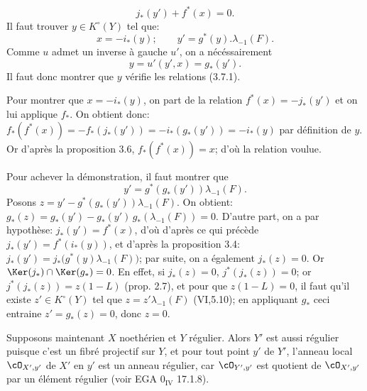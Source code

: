 \[
j_*(y')+f^*(x)=0.
\]
Il
faut trouver \(y\in K^\circ(Y)\) tel que:
\begin{equation}\tag{3.7.1}
x=-i_*(y);\qquad y'=g^*(y).\lambda_{-1}(F).
\end{equation}
Comme \(u\) admet un inverse à gauche \(u'\), on a nécéssairement
\[
y=u'(y',x)=g_*(y').
\]
Il faut donc montrer que \(y\) vérifie les relations (3.7.1).

Pour montrer que \(x=-i_*(y)\), on part de la relation \(f^*(x)=-j_*(y')\) et on lui applique \(f_*\). On obtient donc: \(f_*(f^*(x))=-f_*(j_*(y'))=-i_*(g_*(y'))=-i_*(y)\) par définition de \(y\). Or d'après la proposition 3.6, \(f_*(f^*(x))=x\); d'où la relation voulue.

Pour achever la démonstration, il faut montrer que
\[
y'=g^*(g_*(y'))\lambda_{-1}(F).
\]
Posons \(z=y'-g^*(g_*(y'))\lambda_{-1}(F)\). On obtient: \(g_*(z)=g_*(y')-g_*(y')\,g_*(\lambda_{-1}(F))=0\). D'autre part, on a par hypothèse: \(j_*(y')=f^*(x)\), d'où d'après ce qui précède \(j_*(y')=f^*(i_*(y))\), et d'après la proposition 3.4: \(j_*(y')=j_*\bigl(g^*(y)\lambda_{-1}(F)\bigr)\); par suite, on a également \(j_*(z)=0\). Or \(\Ker(j_*)\cap\Ker(g_*)=0\). En effet, si \(j_*(z)=0\), \(j^*(j_*(z))=0\); or \(j^*(j_*(z))=z(1-L)\) (prop. 2.7), et pour que \(z(1-L)=0\), il faut qu'il existe \(z'\in K^\circ(Y)\) tel que \(z=z'\lambda_{-1}(F)\) (VI,5.10); en appliquant \(g_*\) ceci entraine \(z'=g_*(z)=0\), donc \(z=0\).

Supposons maintenant \(X\) noethérien et \(Y\) régulier. Alors \(Y'\) est aussi régulier puisque c'est un fibré projectif sur \(Y\), et pour tout point \(y'\) de \(Y'\), l'anneau local \(\cO_{X',y'}\) de \(X'\) en \(y'\) est un anneau régulier, car \(\cO_{Y',y'}\) est quotient de \(\cO_{X',y'}\) par un élément régulier (voir EGA \(0_{\mathrm{IV}}\) 17.1.8).

